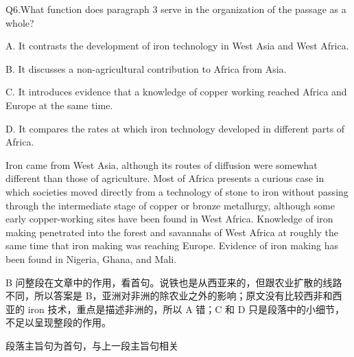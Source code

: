 \begin{blk}
    \begin{qst}
        Q6.What function does paragraph 3 serve in the organization of the passage as a whole?
    \end{qst}

    \begin{chc}
        A. It contrasts the development of iron technology in West Asia and West Africa.

        B. It discusses a non-agricultural contribution to Africa from Asia.

        C. It introduces evidence that a knowledge of copper working reached Africa and Europe at the same time.

        D. It compares the rates at which iron technology developed in different parts of Africa.
    \end{chc}

    \begin{psgq}
        Iron came from West Asia, although its routes of diffusion were somewhat different than those of agriculture. Most of Africa presents a curious case in which societies moved directly from a technology of stone to iron without passing through the intermediate stage of copper or bronze metallurgy, although some early copper-working sites have been found in West Africa. Knowledge of iron making penetrated into the forest and savannahs of West Africa at roughly the same time that iron making was reaching Europe. Evidence of iron making has been found in Nigeria, Ghana, and Mali.
    \end{psgq}

    \begin{nlz}
        B 问整段在文章中的作用，看首句。说铁也是从西亚来的，但跟农业扩散的线路不同，所以答案是 B，亚洲对非洲的除农业之外的影响；原文没有比较西非和西亚的 iron 技术，重点是描述非洲的，所以 A 错；C 和 D 只是段落中的小细节，不足以呈现整段的作用。

        段落主旨句为首句，与上一段主旨句相关
    \end{nlz}
\end{blk}
